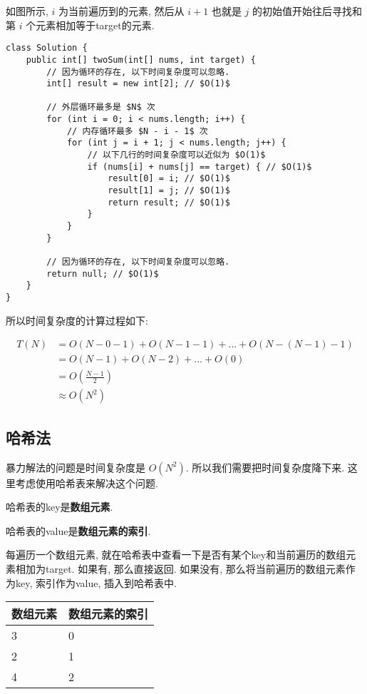 \documentclass[oneside]{ctexbook}
\begin{document}
如图所示, $i$ 为当前遍历到的元素, 然后从 $i+1$ 也就是 $j$ 的初始值开始往后寻找和第 $i$ 个元素相加等于target的元素.

\begin{verbatim}
class Solution {
    public int[] twoSum(int[] nums, int target) {
        // 因为循环的存在, 以下时间复杂度可以忽略.
        int[] result = new int[2]; // $O(1)$

        // 外层循环最多是 $N$ 次
        for (int i = 0; i < nums.length; i++) {
            // 内存循环最多 $N - i - 1$ 次
            for (int j = i + 1; j < nums.length; j++) {
                // 以下几行的时间复杂度可以近似为 $O(1)$
                if (nums[i] + nums[j] == target) { // $O(1)$
                    result[0] = i; // $O(1)$
                    result[1] = j; // $O(1)$
                    return result; // $O(1)$
                }
            }
        }

        // 因为循环的存在, 以下时间复杂度可以忽略.
        return null; // $O(1)$
    }
}
\end{verbatim}

所以时间复杂度的计算过程如下:

\begin{equation*}
    \begin{split}
    T(N) &= O(N-0-1) + O(N-1-1) + ... + O(N-(N-1)-1) \\
         &= O(N-1) + O(N-2) + ... + O(0) \\
         &= O(\frac{N-1}{2}) \\
         &\approx O(N^2)
    \end{split}
\end{equation*}

\subsection{哈希法}

暴力解法的问题是时间复杂度是 $O(N^2)$. 所以我们需要把时间复杂度降下来. 这里考虑使用哈希表来解决这个问题.

哈希表的key是\textbf{数组元素}.

哈希表的value是\textbf{数组元素的索引}.

每遍历一个数组元素, 就在哈希表中查看一下是否有某个key和当前遍历的数组元素相加为target. 如果有, 那么直接返回. 如果没有, 那么将当前遍历的数组元素作为key, 索引作为value, 插入到哈希表中.


\begin{table}[!h]
\centering
    
\begin{tabular}{|p{}|p{}|}
\hline 
数组元素 & 数组元素的索引 \\
\hline 
3 & 0 \\
\hline 
2 & 1 \\
\hline 
4 & 2 \\
\hline
\end{tabular}
    
\end{table}
\end{document}
